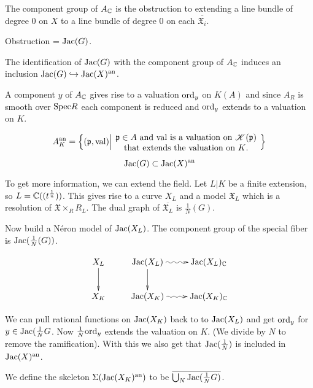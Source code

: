 \noindent The component group of $A_{\mathbb{C}}$ is the obstruction to extending a line bundle of degree 0 on $X$ to a line bundle of degree 0 on each $\overline{\mathfrak{X}_i}$.

\noindent Obstruction = $\mathrm{Jac}(G)$.

The identification of $\mathrm{Jac}(G)$ with the component group of $A_{\mathbb{C}}$ induces an inclusion $\mathrm{Jac}(G)\hookrightarrow \mathrm{Jac}(X)^{\mathrm{an}}$.

A component $y$ of $A_{\mathbb{C}}$ gives rise to a valuation $\mathrm{ord}_y$ on $K(A)$ and since $A_R$ is smooth over $\mathrm{Spec} R$ each component is reduced and $\mathrm{ord}_y$ extends to a valuation on $K$.


\[
	A_K^{\an} = \left\{(\mathfrak{p},\val) \middle\vert
		\parbox{.5\textwidth}{\centering$\mathfrak{p}\in A$ and $\val$ is a valuation on $\mathcal{K}(\mathfrak{p})$ that extends the valuation on $K$.}
	\right\}
\]

\[\mathrm{Jac}(G)\subset \mathrm{Jac}(X)^{\mathrm{an}}\]

To get more information, we can extend the field. Let $L|K$ be a finite extension, so $L = \mathbb{C}((t^{\frac{1}{n}}))$. This gives rise to a curve $X_L$ and a model $\mathfrak{X}_L$ which is a resolution of $\mathfrak{X}\times_R R_L$. The dual graph of $\overline{\mathfrak{X}_L}$ is $\frac{1}{N}(G)$.

Now build a N\'eron model of $\mathrm{Jac}(X_L)$. The component group of the special fiber is $\mathrm{Jac}(\frac{1}{N}(G))$.

\[
\xymatrix{
X_L \ar[d] & \Jac(X_L) \ar[d] \ar@{~>}[r] & \Jac(X_L)_{\CC} \\
X_K & \Jac(X_K) \ar@{~>}[r] & \Jac(X_K)_{\CC}
}
\]

\noindent We can pull rational functions on $\mathrm{Jac}(X_K)$ back  to to $\mathrm{Jac}(X_L)$ and get $\mathrm{ord}_y$ for $y\in\mathrm{Jac}(\frac{1}{N}G$. Now $\frac{1}{N}\mathrm{ord}_y$ extends the valuation on $K$. (We divide by $N$ to remove the ramification). With this we also get that $\mathrm{Jac}(\frac{1}{N})$ is included in $\mathrm{Jac}(X)^{\mathrm{an}}$.

\begin{definition} We define the skeleton $\Sigma(\mathrm{Jac}(X_K)^{\mathrm{an}})$ to be $\overline{\bigcup_N \mathrm{Jac}(\frac{1}{N}G)}$.
\end{definition}
